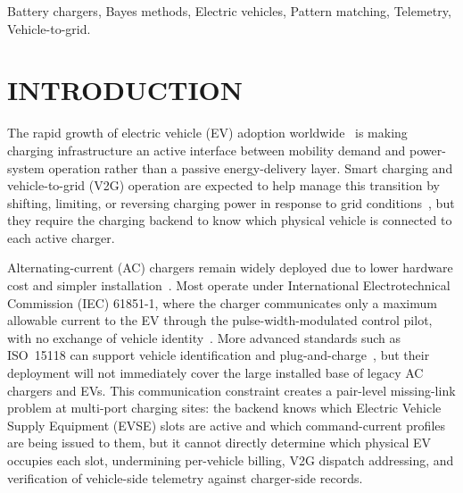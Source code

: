 \documentclass{ieeeaccess}
\begin{document}
    \begin{keywords}
        Battery chargers, Bayes methods, Electric vehicles, Pattern matching, Telemetry, Vehicle-to-grid.
    \end{keywords}

    \titlepgskip=-15pt

    \maketitle

    \section{INTRODUCTION}

    The rapid growth of electric vehicle (EV) adoption worldwide~\cite{biea26} is making charging infrastructure an active interface between mobility demand and power-system operation rather than a passive energy-delivery layer.
    Smart charging and vehicle-to-grid (V2G) operation are expected to help manage this transition by shifting, limiting, or reversing charging power in response to grid conditions~\cite{b2,b3,b5}, but they require the charging backend to know which physical vehicle is connected to each active charger.

    Alternating-current (AC) chargers remain widely deployed due to lower hardware cost and simpler installation~\cite{b8}.
    Most operate under International Electrotechnical Commission (IEC) 61851-1, where the charger communicates only a maximum allowable current to the EV through the pulse-width-modulated control pilot, with no exchange of vehicle identity~\cite{biec,b6}.
    More advanced standards such as ISO~15118 can support vehicle identification and plug-and-charge~\cite{b7}, but their deployment will not immediately cover the large installed base of legacy AC chargers and EVs.
    This communication constraint creates a pair-level missing-link problem at multi-port charging sites: the backend knows which Electric Vehicle Supply Equipment (EVSE) slots are active and which command-current profiles are being issued to them, but it cannot directly determine which physical EV occupies each slot, undermining per-vehicle billing, V2G dispatch addressing, and verification of vehicle-side telemetry against charger-side records.
\end{document}
